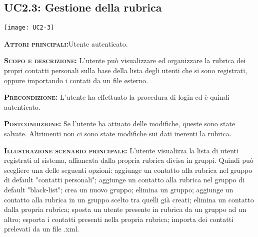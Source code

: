 \subsection{UC2.3: Gestione della rubrica}
\begin{center}
\texttt{[image: UC2-3]}
\end{center}
\begin{description}
\item{\scshape\bfseries Attori principali:}Utente autenticato.
\item{\scshape\bfseries Scopo e descrizione:} L'utente può visualizzare ed organizzare la rubrica dei propri contatti personali sulla base della lista degli utenti che si sono registrati, oppure importando i contati da un file esterno.
\item{\scshape\bfseries Precondizione:} L'utente ha effettuato la procedura di login ed è quindi autenticato.
\item{\scshape\bfseries Postcondizione:} Se l'utente ha attuato delle modifiche, queste sono state salvate. Altrimenti non ci sono state modifiche sui dati inerenti la rubrica.
\item{\scshape\bfseries Illustrazione scenario principale:} L'utente visualizza la lista di utenti registrati al sistema, affiancata dalla propria rubrica divisa in gruppi. Quindi può scegliere una delle seguenti opzioni: aggiunge un contatto alla rubrica nel gruppo di default "contatti personali"; aggiunge un contatto alla rubrica nel gruppo di default "black-list"; crea un nuovo gruppo; elimina un gruppo; aggiunge un contatto alla rubrica in un gruppo scelto tra quelli già creati; elimina un contatto dalla propria rubrica;  sposta un utente presente in rubrica da un gruppo ad un altro; esporta i contatti presenti nella propria rubrica; importa dei contatti prelevati da un file .xml.
\end{description}

